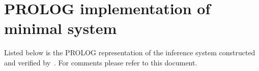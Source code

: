 \chapter[PROLOG implementation of minimal system]{PROLOG implementation of minimal system}\label{appMinimalPROLOG}

Listed below is the PROLOG representation of the inference system constructed and verified by~\cite{Larsen}. For comments please refer to this document.

%
